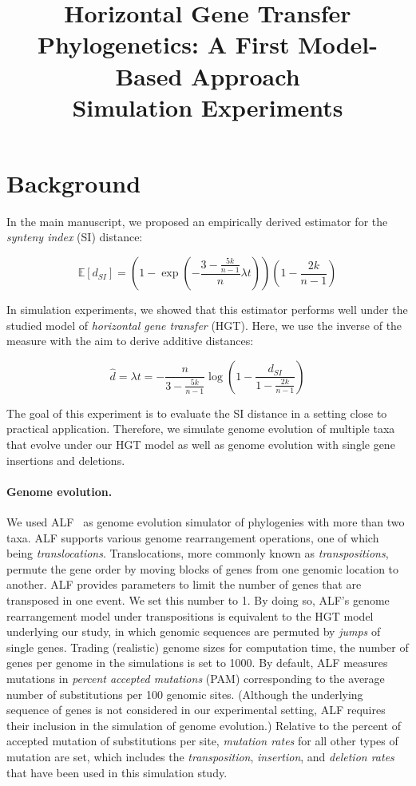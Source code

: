\documentclass[9pt,english,utf8]{article}
\title{Horizontal Gene Transfer Phylogenetics: A First Model-Based Approach\\
Simulation Experiments}
\begin{document}
\maketitle

\section*{Background}

In the main manuscript, we proposed an empirically derived estimator for the
\emph{synteny index} (SI) distance:

\begin{equation}
    \mathbb E[d_{SI}] = \left(1-\exp\left(-\frac{3-\frac{5k}{n-1}}{n} \lambda
    t\right)\right) \left(1-\frac{2k}{n-1}\right)
\end{equation}

In simulation experiments, we showed that this estimator performs well under
the studied model of \emph{horizontal gene transfer} (HGT). Here, we use the
inverse of the measure with the aim to derive additive distances:

\begin{equation}
    \hat d= \lambda t = -\frac{n}{3-\frac{5k}{n-1}}
    \log\left(1 - \frac{d_{SI}}{1-\frac{2k}{n-1}}\right)
\end{equation}

The goal of this experiment is to evaluate the SI distance in a setting close
to practical application. Therefore, we simulate genome evolution of multiple
taxa that evolve under our HGT model as well as genome evolution with single
gene insertions and deletions. 

\paragraph{Genome evolution.} We used ALF~\cite{Dalquen:2012dx} as genome
evolution simulator of phylogenies with more than two taxa. ALF supports
various genome rearrangement operations, one of which being
\emph{translocations}. Translocations, more commonly known as
\emph{transpositions}, permute the gene order by moving blocks of genes from
one genomic location to another. ALF provides parameters to limit the number of
genes that are transposed in one event. We set this number to 1. By doing so,
ALF's genome rearrangement model under transpositions is equivalent to the HGT
model underlying our study, in which genomic sequences are permuted by
\emph{jumps} of single genes. Trading (realistic) genome sizes for computation
time, the number of genes per genome in the simulations is set to 1000. By
default, ALF measures mutations in \emph{percent accepted mutations} (PAM)
corresponding to the average number of substitutions per 100 genomic sites.
(Although the underlying sequence of genes is not considered in our
experimental setting, ALF requires their inclusion in the simulation of genome
evolution.) Relative to the percent of accepted mutation of substitutions per
site, \emph{mutation rates} for all other types of mutation are set, which
includes the \emph{transposition}, \emph{insertion}, and \emph{deletion rates}
that have been used in this simulation study. 
\end{document}

